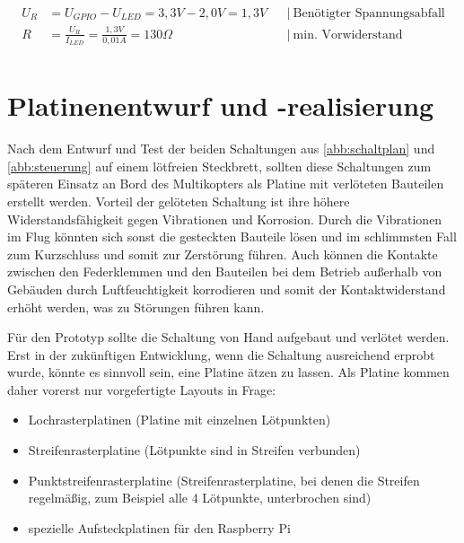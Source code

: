 \documentclass[a4paper,12pt,bibliography=totoc, listof=totoc,titlepage,pointlessnumbers]{scrreprt}
\begin{document}
\begin{equation}
\begin{aligned}
U_R &= U_{GPIO} - U_{LED} = 3,3V - 2,0V = 1,3V    && \left|\  \text{Benötigter Spannungsabfall} \right. \\
R &= \frac{U_R}{I_{LED}} = \frac{1,3V}{0,01A} = 130\Omega   && \left|\  \text{min. Vorwiderstand} \right. \\
\end{aligned}
\label{eq:vorwiderstand}
\end{equation}

\section{Platinenentwurf und -realisierung}
Nach dem Entwurf und Test der beiden Schaltungen aus \autoref{abb:schaltplan} und \autoref{abb:steuerung} auf einem lötfreien Steckbrett, sollten diese Schaltungen zum späteren Einsatz an Bord des Multikopters als Platine mit verlöteten Bauteilen erstellt werden. Vorteil der gelöteten Schaltung ist ihre höhere Widerstandsfähigkeit gegen Vibrationen und Korrosion. Durch die Vibrationen im Flug könnten sich sonst die gesteckten Bauteile lösen und im schlimmsten Fall zum Kurzschluss und somit zur Zerstörung führen. Auch können die Kontakte zwischen den Federklemmen und den Bauteilen bei dem Betrieb außerhalb von Gebäuden durch Luftfeuchtigkeit korrodieren und somit der Kontaktwiderstand erhöht werden, was zu Störungen führen kann.

Für den Prototyp sollte die Schaltung von Hand aufgebaut und verlötet werden. Erst in der zukünftigen Entwicklung, wenn die Schaltung ausreichend erprobt wurde, könnte es sinnvoll sein, eine Platine ätzen zu lassen. Als Platine kommen daher vorerst nur vorgefertigte Layouts in Frage:

\begin{itemize}
 \item Lochrasterplatinen (Platine mit einzelnen Lötpunkten)
 \item Streifenrasterplatine (Lötpunkte sind in Streifen verbunden)
 \item Punktstreifenrasterplatine (Streifenrasterplatine, bei denen die Streifen regelmäßig, zum Beispiel alle 4 Lötpunkte, unterbrochen sind)
 \item spezielle Aufsteckplatinen für den Rasp\-berry Pi
\end{itemize}
\end{document}
